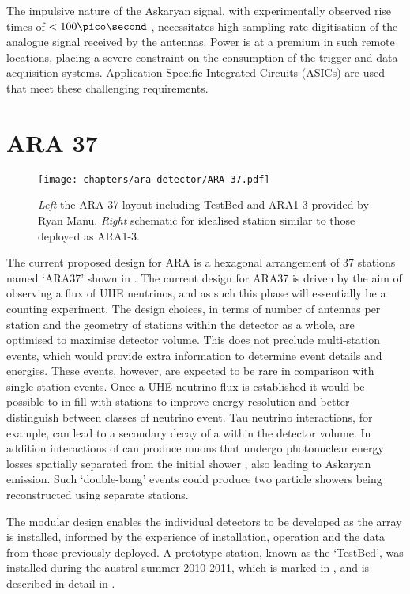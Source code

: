 The impulsive nature of the Askaryan signal, with experimentally observed rise times of $< 100 \pico \second$ \cite{PhysRevLett.86.2802}, necessitates high sampling rate digitisation of the analogue signal received by the antennas. Power is at a premium in such remote locations, placing a severe constraint on the consumption of the trigger and data acquisition systems. Application Specific Integrated Circuits (ASICs) are used that meet these challenging requirements.



\section{ARA 37}
\label{sec:ara-detector:ARA37}

\begin{figure}[htpb]
  \centering
  \texttt{[image: chapters/ara-detector/ARA-37.pdf]}
  \caption{\textit{Left} the ARA-37 layout including TestBed and ARA1-3 provided by Ryan Manu. \textit{Right} schematic for idealised station similar to those deployed as ARA1-3.}
  \label{fig:ara-detector:ARA-37:ARA-37}
\end{figure}

The current proposed design for ARA is a hexagonal arrangement of 37 stations named `ARA37' shown in . The current design for ARA37 is driven by the aim of observing a flux of UHE neutrinos, and as such this phase will essentially be a counting experiment. The design choices, in terms of number of antennas per station and the geometry of stations within the detector as a whole, are optimised to maximise detector volume. This does not preclude multi-station events, which would provide extra information to determine event details and energies. These events, however, are expected to be rare in comparison with single station events. Once a UHE neutrino flux is established it would be possible to in-fill with stations to improve energy resolution and better distinguish between classes of neutrino event. Tau neutrino interactions, for example, can lead to a secondary decay of a \Ptau within the detector volume. In addition interactions of \Pnum can produce muons that undergo photonuclear energy losses spatially separated from the initial shower \cite{MercurioThesis}, also leading to Askaryan emission. Such `double-bang' events could produce two particle showers being reconstructed using separate stations.


The modular design enables the individual detectors to be developed as the array is installed, informed by the experience of installation, operation and the data from those previously deployed. A prototype station, known as the `TestBed', was installed during the austral summer 2010-2011, which is marked in , and is described in detail in . 



